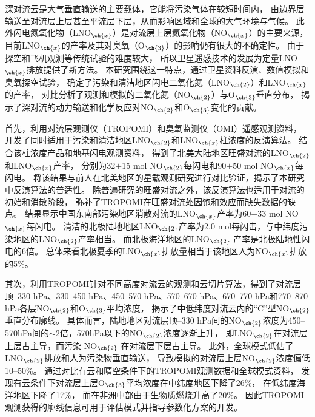 
\abstract
{
深对流云是大气垂直输送的主要载体，它能将污染气体在较短时间内，
由边界层输送至对流层上层甚至平流层下层，从而影响区域和全球的大气环境与气候。
此外闪电氮氧化物（LNO$_{\ch{x}}$）是对流层上层氮氧化物（NO$_{\ch{x}}$）的主要来源，目前LNO$_{\ch{x}}$的产率及其对臭氧（O$_{\ch{3}}$）的影响仍有很大的不确定性。
由于探空和飞机观测等传统试验的难度较大，
所以卫星遥感技术的发展为定量LNO$_{\ch{x}}$排放提供了新方法。
本研究围绕这一特点，通过卫星资料反演、数值模拟和臭氧探空试验，
确定了污染和清洁地区闪电二氧化氮（LNO$_{\ch{2}}$）和LNO$_{\ch{x}}$的产率，
对比分析了观测和模拟的二氧化氮（NO$_{\ch{2}}$）与O$_{\ch{3}}$垂直分布，
揭示了深对流的动力输送和化学反应对NO$_{\ch{2}}$和O$_{\ch{3}}$变化的贡献。

首先，利用对流层观测仪（TROPOMI）和臭氧监测仪（OMI）遥感观测资料，
开发了同时适用于污染和清洁地区LNO$_{\ch{2}}$和LNO$_{\ch{x}}$柱浓度的反演算法。
结合该柱浓度产品和地基闪电观测资料，
得到了北美大陆地区旺盛对流的LNO$_{\ch{2}}$和LNO$_{\ch{x}}$产率，
分别为32$\pm$15 mol NO$_{\ch{2}}$每闪电和90$\pm$50 mol NO$_{\ch{x}}$每闪电。
将该结果与前人在北美地区的星载观测研究进行对比验证，揭示了本研究中反演算法的普适性。
除普遍研究的旺盛对流之外，该反演算法也适用于对流的初始和消散阶段，
弥补了TROPOMI在旺盛对流处因饱和效应而缺失数据的缺点。
结果显示中国东南部污染地区消散对流的LNO$_{\ch{x}}$产率为60$\pm$33 mol NO$_{\ch{x}}$每闪电。
清洁的北极陆地地区LNO$_{\ch{2}}$产率为2.0 mol每闪击，与中纬度污染地区的LNO$_{\ch{2}}$产率相当。
而北极海洋地区的LNO$_{\ch{2}}$ 产率是北极陆地性闪电的6倍。
总体来看北极夏季的LNO$_{\ch{x}}$排放量相当于该地区人为NO$_{\ch{x}}$排放的5\%。

其次，利用TROPOMI针对不同高度对流云的观测和云切片算法，得到了对流层顶--330 hPa、330--450 hPa、450--570 hPa、570--670 hPa、670--770 hPa和770--870 hPa各层NO$_{\ch{2}}$和O$_{\ch{3}}$平均浓度，
揭示了中低纬度对流云内的“C”型NO$_{\ch{2}}$垂直分布廓线。
具体而言，陆地地区对流层顶--330 hPa间的NO$_{\ch{2}}$浓度为450--570hPa间的$\sim$2倍，570hPa以下的NO$_{\ch{2}}$浓度逐渐上升，
即LNO$_{\ch{2}}$在对流层上层占主导，而污染 NO$_{\ch{2}}$ 在对流层下层占主导。
此外，全球模式低估了LNO$_{\ch{2}}$排放和人为污染物垂直输送，
导致模拟的对流层上层NO$_{\ch{2}}$浓度偏低10--50\%。
通过对比有云和晴空条件下的TROPOMI观测数据和全球模式资料，
发现有云条件下对流层上层O$_{\ch{3}}$平均浓度在中纬度地区下降了26\%，
在低纬度海洋地区下降了17\%，
而在非洲中部由于生物质燃烧升高了20\%。
因此TROPOMI观测获得的廓线信息可用于评估模式并指导参数化方案的开发。

}
